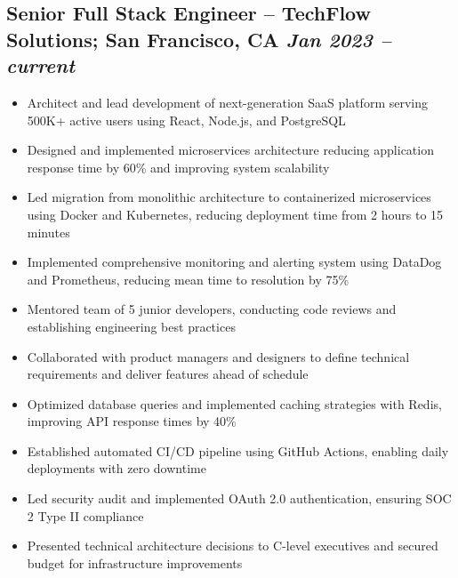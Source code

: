 \documentclass[a4paper,10pt]{article}           %
\begin{document}
    \subsection*{Senior Full Stack Engineer – TechFlow Solutions; San Francisco, CA \hfill \textit{Jan 2023 – current}}
    \vspace{-0.5em}                      %
    \begin{itemize}[leftmargin=0.2cm, itemsep=0pt, label=--]
        \item Architect and lead development of next-generation SaaS platform serving 500K+ active users using React, Node.js, and PostgreSQL
        \item Designed and implemented microservices architecture reducing application response time by 60\% and improving system scalability
        \item Led migration from monolithic architecture to containerized microservices using Docker and Kubernetes, reducing deployment time from 2 hours to 15 minutes
        \item Implemented comprehensive monitoring and alerting system using DataDog and Prometheus, reducing mean time to resolution by 75\%
        \item Mentored team of 5 junior developers, conducting code reviews and establishing engineering best practices
        \item Collaborated with product managers and designers to define technical requirements and deliver features ahead of schedule
        \item Optimized database queries and implemented caching strategies with Redis, improving API response times by 40\%
        \item Established automated CI/CD pipeline using GitHub Actions, enabling daily deployments with zero downtime
        \item Led security audit and implemented OAuth 2.0 authentication, ensuring SOC 2 Type II compliance
        \item Presented technical architecture decisions to C-level executives and secured budget for infrastructure improvements
    \end{itemize}
\end{document}
